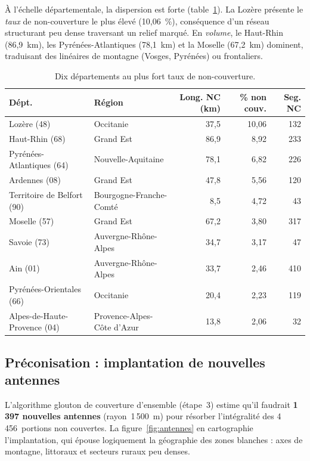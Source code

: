 \documentclass[11pt,a4paper]{article}
\begin{document}
À l'échelle départementale, la dispersion est forte (table~\ref{tab:depts}). La Lozère présente le \emph{taux} de non-couverture le plus élevé (10{,}06~\%), conséquence d'un réseau structurant peu dense traversant un relief marqué. En \emph{volume}, le Haut-Rhin (86{,}9~km), les Pyrénées-Atlantiques (78{,}1~km) et la Moselle (67{,}2~km) dominent, traduisant des linéaires de montagne (Vosges, Pyrénées) ou frontaliers.

\begin{table}[H]
  \centering
  \caption{Dix départements au plus fort taux de non-couverture.}
  \label{tab:depts}
  \small
  \begin{tabular}{llrrr}
    \toprule
    \textbf{Dépt.} & \textbf{Région} & \textbf{Long. NC (km)} & \textbf{\% non couv.} & \textbf{Seg. NC} \\
    \midrule
    Lozère (48)                  & Occitanie                  & 37{,}5 & 10{,}06 & 132 \\
    Haut-Rhin (68)               & Grand Est                  & 86{,}9 & 8{,}92  & 233 \\
    Pyrénées-Atlantiques (64)    & Nouvelle-Aquitaine         & 78{,}1 & 6{,}82  & 226 \\
    Ardennes (08)                & Grand Est                  & 47{,}8 & 5{,}56  & 120 \\
    Territoire de Belfort (90)   & Bourgogne-Franche-Comté    & 8{,}5  & 4{,}72  & 43  \\
    Moselle (57)                 & Grand Est                  & 67{,}2 & 3{,}80  & 317 \\
    Savoie (73)                  & Auvergne-Rhône-Alpes       & 34{,}7 & 3{,}17  & 47  \\
    Ain (01)                     & Auvergne-Rhône-Alpes       & 33{,}7 & 2{,}46  & 410 \\
    Pyrénées-Orientales (66)     & Occitanie                  & 20{,}4 & 2{,}23  & 119 \\
    Alpes-de-Haute-Provence (04) & Provence-Alpes-Côte d'Azur & 13{,}8 & 2{,}06  & 32  \\
    \bottomrule
  \end{tabular}
\end{table}

\subsection{Préconisation : implantation de nouvelles antennes}

L'algorithme glouton de couverture d'ensemble (étape~3) estime qu'il faudrait \textbf{1\,397 nouvelles antennes} (rayon~1\,500~m) pour résorber l'intégralité des 4\,456~portions non couvertes. La figure~\ref{fig:antennes} en cartographie l'implantation, qui épouse logiquement la géographie des zones blanches : axes de montagne, littoraux et secteurs ruraux peu denses.
\end{document}

